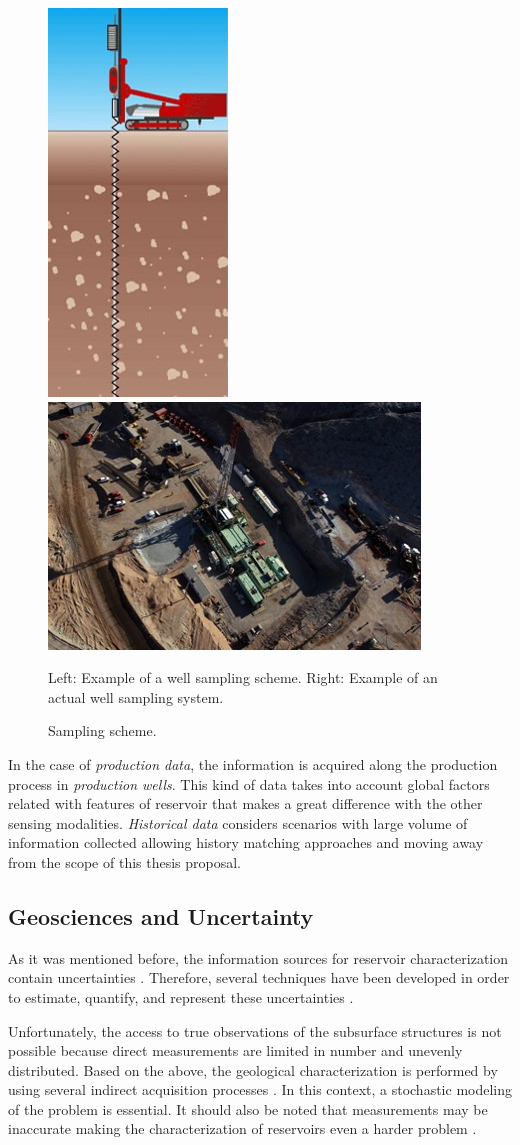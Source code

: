 		\begin{figure}
		\centering
		\includegraphics[width=0.12	\textwidth]{Figs_QE/sondaje1}
		\includegraphics[width=0.37	\textwidth]{Figs_QE/sondaje2}

		\caption{Sampling scheme.}
		\scriptsize{Left: Example of a well sampling scheme. Right: Example of an actual well sampling system.}
		\label{fig:samplingWell}
		\end{figure}

In the case of \emph{production data}, the information is acquired along the production process in \emph{production wells}. This kind of data takes into account global factors related with features of reservoir that makes a great difference with the other sensing modalities. \emph{Historical data} considers scenarios with large volume of information collected allowing history matching approaches \cite{ katanidis_1997_a, Oliver_2008_a, Scheidt2009_a} and moving away from the scope of this thesis proposal.



\subsection{Geosciences and Uncertainty}

As it was mentioned before, the information sources for reservoir characterization contain uncertainties \cite{Onwunalu09,GuyagulerBaris2002_a,wellmann2013information}. Therefore, several techniques have been developed in order to estimate, quantify, and represent these uncertainties \cite{Bangerth04onoptimization,krause08efficient}. 

Unfortunately, the access to true observations of the subsurface structures is not possible because direct measurements are limited in number and unevenly distributed. Based on the above, the geological characterization is performed by using several indirect acquisition processes \cite{katanidis_1997_a,Oliver_2008_a}. In this context, a stochastic modeling of the problem is essential. It should also be noted that measurements may be inaccurate making the characterization of reservoirs even a harder problem \cite{Bangerth04onoptimization}.

